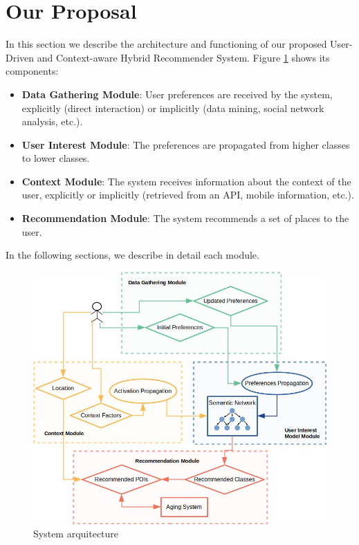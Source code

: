 \section{Our Proposal}
\label{sec:proposal}

In this section we describe the architecture and functioning of our proposed User-Driven and Context-aware Hybrid Recommender System. Figure \ref{fig:arquitecture} shows its components:
\begin{itemize}
    \item \textbf{Data Gathering Module}: User preferences are received by the system, explicitly (direct interaction) or implicitly (data mining, social network analysis, etc.).
    \item \textbf{User Interest Module}: The preferences are propagated from higher classes to lower classes.
    \item \textbf{Context Module}: The system receives information about the context of the user, explicitly or implicitly (retrieved from an API, mobile information, etc.).
    \item \textbf{Recommendation Module}: The system recommends a set of places to the user.
\end{itemize}

In the following sections, we describe in detail each module.

\begin{figure}[h]
\centering
\includegraphics[scale=0.4]{draws/arquitecture.jpg}
\caption{System arquitecture}
\label{fig:arquitecture}
\end{figure}


